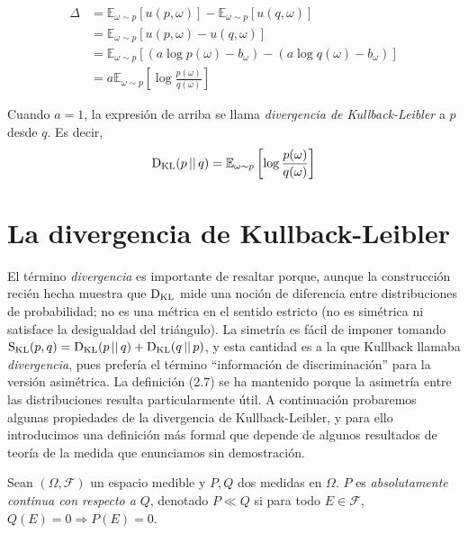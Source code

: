 \documentclass[main.tex]{subfiles}
\begin{document}
\begin{align*}
	\Delta &= \mathbb{E}_{\omega \sim p}\left[u(p, \omega)\right] - \mathbb{E}_{\omega\sim p}\left[u(q, \omega)\right]  \\
	&= \mathbb{E}_{\omega \sim p}\left[u(p, \omega) - u(q, \omega)\right] \\
	&= \mathbb{E}_{\omega \sim p}\left[(a\log p(\omega) - b_\omega) - (a\log q(\omega) - b_\omega) \right] \\
	&= a\mathbb{E}_{\omega \sim p}\left[\log\frac{p(\omega)}{q(\omega)}\right]
\end{align*}

\begin{definition}
	Cuando $a=1$, la expresión de arriba se llama \textit{divergencia de Kullback-Leibler} a $p$ desde $q$. Es decir, 
	\begin{equation}
	\operatorname*{D_{KL}}(p \operatorname*{\mid\mid} q) = \mathbb{E}_{\omega \sim p}\left[\log\frac{p(\omega)}{q(\omega)}\right]	
	\end{equation}
\end{definition}

\section{La divergencia de Kullback-Leibler}
El término \textit{divergencia} es importante de resaltar porque, aunque la construcción recién hecha muestra que $\operatorname*{D_{KL}}$ mide una noción de diferencia entre distribuciones de probabilidad; no es una métrica en el sentido estricto (no es simétrica ni satisface la desigualdad del triángulo). La simetría es fácil de imponer tomando $\operatorname*{S_{KL}}(p, q) = \operatorname*{D_{KL}}(p\operatorname*{\mid\mid} q) + \operatorname*{D_{KL}}(q \operatorname*{\mid\mid} p)$, y esta cantidad es a la que Kullback llamaba \textit{divergencia}, pues prefería el término \enquote{información de discriminación} para la versión asimétrica. La definición (2.7) se ha mantenido porque la asimetría entre las distribuciones resulta particularmente útil. A continuación probaremos algunas propiedades de la divergencia de Kullback-Leibler, y para ello introducimos una definición más formal que depende de algunos resultados de teoría de la medida que enunciamos sin demostración.

\begin{definition}
Sean $(\Omega, \mathcal{F})$ un espacio medible y $P, Q$ dos medidas en $\Omega$. $P$ es \textit{absolutamente continua con respecto a} $Q$, denotado $P\ll Q$ si
	para todo $E\in\mathcal{F}$,  $Q(E)=0 \Rightarrow P(E)=0$.
\end{definition}
\end{document}

